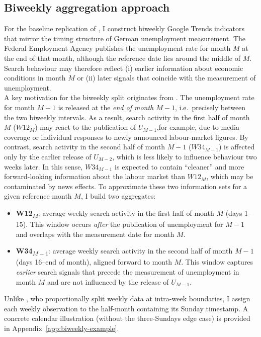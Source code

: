 \documentclass[12pt,a4paper]{article}
\begin{document}
\subsection{Biweekly aggregation approach}
For the baseline replication of \citet{Askitas}, I construct biweekly Google Trends indicators that mirror the timing structure of German unemployment measurement. The Federal Employment Agency publishes the unemployment rate for month $M$ at the end of that month, although the reference date lies around the middle of $M$. 
Search behaviour may therefore reflect (i) earlier information about economic conditions in month $M$ or (ii) later signals that coincide with the measurement of unemployment.\\
A key motivation for the biweekly split originates from \citet{Askitas}. The unemployment rate for month $M{-}1$ is released at the \emph{end of month $M{-}1$}, i.e.\ precisely between the two biweekly intervals. As a result, search activity in the first half of month $M$ (\(W12_M\)) may react to the publication of $U_{M-1}$,for example, due to media coverage or individual responses to newly announced labour-market figures. By contrast, search activity in the second half of month $M{-}1$ (\(W34_{M-1}\)) is affected only by the earlier release of $U_{M-2}$, which is less likely to influence behaviour two weeks later. In this sense, \(W34_{M-1}\) is expected to contain “cleaner” and more forward-looking information about the labour market than \(W12_M\), which may be contaminated by news effects.
To approximate these two information sets for a given reference month $M$, I build two aggregates:
\begin{itemize}
    \item \textbf{W12\textsubscript{$M$}}: average weekly search activity in the first half of month $M$ (days 1--15). This window occurs \emph{after} the publication of unemployment for $M{-}1$ and overlaps with the measurement date for month $M$.
    \item \textbf{W34\textsubscript{$M-1$}}: average weekly search activity in the second half of month $M{-}1$ (days 16--end of month), aligned forward to month $M$. This window captures \emph{earlier} search signals that precede the measurement of unemployment in month $M$ and are not influenced by the release of $U_{M-1}$.
\end{itemize}
Unlike \citet{Askitas}, who proportionally split weekly data at intra-week boundaries, I assign each weekly observation to the half-month containing its Sunday timestamp. A concrete calendar illustration (without the three-Sundays edge case) is provided in Appendix~\ref{app:biweekly-example}.\\
\end{document}
